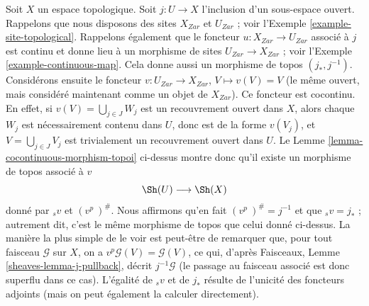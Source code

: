 \begin{example}
\label{example-open-immersion-cocontinuous}
Soit $X$ un espace topologique.
Soit $j : U  \to X$ l’inclusion d’un sous-espace ouvert.
Rappelons que nous disposons des sites $X_{Zar}$ et $U_{Zar}$ ; voir
l’Exemple \ref{example-site-topological}.
Rappelons également que le foncteur $u : X_{Zar} \to U_{Zar}$ associé à $j$
est continu et donne lieu à un morphisme de sites
$U_{Zar} \to X_{Zar}$ ; voir l’Exemple \ref{example-continuous-map}.
Cela donne aussi un morphisme de topos $(j_*, j^{-1})$.
Considérons ensuite le foncteur
$v : U_{Zar} \to X_{Zar}$, $V \mapsto v(V) = V$
(le même ouvert, mais considéré maintenant comme un objet de $X_{Zar}$).
Ce foncteur est cocontinu. En effet, si
$v(V) = \bigcup_{j \in J} W_j$ est un recouvrement ouvert dans $X$, alors
chaque $W_j$ est nécessairement contenu dans $U$, donc est de la forme
$v(V_j)$, et $V = \bigcup_{j \in J} V_j$ est trivialement un recouvrement
ouvert dans $U$. Le Lemme \ref{lemma-cocontinuous-morphism-topoi} ci-dessus
montre donc qu’il existe un morphisme de topos associé à $v$
$$
\Sh(U) \longrightarrow \Sh(X)
$$
donné par ${}_sv$ et $(v^p\ )^\#$. Nous affirmons qu’en fait
$(v^p\ )^\# = j^{-1}$ et que ${}_sv = j_*$ ; autrement dit, c’est le même
morphisme de topos que celui donné ci-dessus. La manière la plus simple de le
voir est peut-être de remarquer que, pour tout faisceau $\mathcal{G}$ sur $X$,
on a $v^p\mathcal{G}(V) = \mathcal{G}(V)$, ce qui, d’après Faisceaux,
Lemme \ref{sheaves-lemma-j-pullback}, décrit $j^{-1}\mathcal{G}$ (le passage au
faisceau associé est donc superflu dans ce cas). L’égalité de ${}_sv$ et de
$j_*$ résulte de l’unicité des foncteurs adjoints (mais on peut également la
calculer directement).
\end{example}

